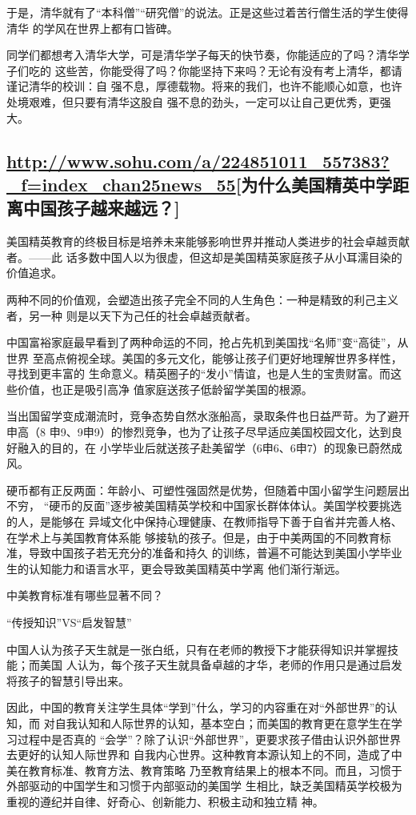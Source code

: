 \documentclass[11pt]{ctexart}
\begin{document}
{{{{于是，清华就有了“本科僧”“研究僧”的说法。正是这些过着苦行僧生活的学生使得清华
的学风在世界上都有口皆碑。

同学们都想考入清华大学，可是清华学子每天的快节奏，你能适应的了吗？清华学子们吃的
这些苦，你能受得了吗？你能坚持下来吗？无论有没有考上清华，都请谨记清华的校训：自
强不息，厚德载物。将来的我们，也许不能顺心如意，也许处境艰难，但只要有清华这股自
强不息的劲头，一定可以让自己更优秀，更强大。

\subsection{\url{http://www.sohu.com/a/224851011\_557383?\_f=index\_chan25news\_55}[为什么美国精英中学距离中国孩子越来越远？]}
\label{sec:org381fd27}
美国精英教育的终极目标是培养未来能够影响世界并推动人类进步的社会卓越贡献者。——此
话多数中国人以为很虚，但这却是美国精英家庭孩子从小耳濡目染的价值追求。

两种不同的价值观，会塑造出孩子完全不同的人生角色：一种是精致的利己主义者，另一种
则是以天下为己任的社会卓越贡献者。



中国富裕家庭最早看到了两种命运的不同，抢占先机到美国找“名师”变“高徒”，从世界
至高点俯视全球。美国的多元文化，能够让孩子们更好地理解世界多样性，寻找到更丰富的
生命意义。精英圈子的“发小”情谊，也是人生的宝贵财富。而这些价值，也正是吸引高净
值家庭送孩子低龄留学美国的根源。

当出国留学变成潮流时，竞争态势自然水涨船高，录取条件也日益严苛。为了避开申高（8
申9、9申9）的惨烈竞争，也为了让孩子尽早适应美国校园文化，达到良好融入的目的，在
小学毕业后就送孩子赴美留学（6申6、6申7）的现象已蔚然成风。



硬币都有正反两面：年龄小、可塑性强固然是优势，但随着中国小留学生问题层出不穷，
“硬币的反面”逐步被美国精英学校和中国家长群体体认。美国学校要挑选的人，是能够在
异域文化中保持心理健康、在教师指导下善于自省并完善人格、在学术上与美国教育体系能
够接轨的孩子。但是，由于中美两国的不同教育标准，导致中国孩子若无充分的准备和持久
的训练，普遍不可能达到美国小学毕业生的认知能力和语言水平，更会导致美国精英中学离
他们渐行渐远。

中美教育标准有哪些显著不同？

“传授知识”VS“启发智慧”

中国人认为孩子天生就是一张白纸，只有在老师的教授下才能获得知识并掌握技能；而美国
人认为，每个孩子天生就具备卓越的才华，老师的作用只是通过启发将孩子的智慧引导出来。

因此，中国的教育关注学生具体“学到”什么，学习的内容重在对“外部世界”的认知，而
对自我认知和人际世界的认知，基本空白；而美国的教育更在意学生在学习过程中是否真的
“会学”？除了认识“外部世界”，更要求孩子借由认识外部世界去更好的认知人际世界和
自我内心世界。这种教育本源认知上的不同，造成了中美在教育标准、教育方法、教育策略
乃至教育结果上的根本不同。而且，习惯于外部驱动的中国学生和习惯于内部驱动的美国学
生相比，缺乏美国精英学校极为重视的遵纪并自律、好奇心、创新能力、积极主动和独立精
神。

}}}}
\end{document}
